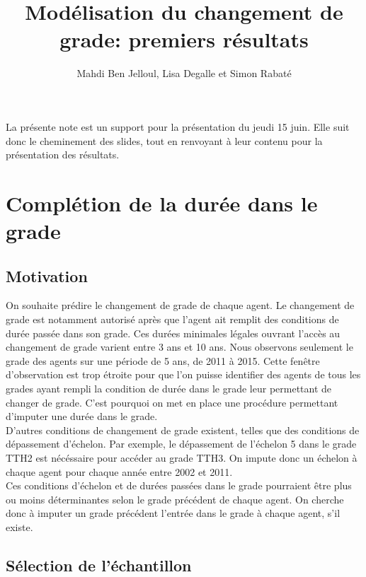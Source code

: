 \documentclass[11pt,a4paper]{article}
\begin{document}
\title{Modélisation du changement de grade: premiers résultats}


\author{Mahdi Ben Jelloul, Lisa Degalle et Simon Rabat\'e}


\maketitle


La présente note est un support pour la présentation du jeudi 15 juin. Elle suit donc le cheminement des slides, tout en renvoyant à leur contenu pour la présentation des résultats. 

\section{Complétion de la durée dans le grade}
\subsection{Motivation}

On souhaite prédire le changement de grade de chaque agent. Le changement de grade est notamment autorisé après que l'agent ait remplit des conditions de durée passée dans son grade. Ces durées minimales légales ouvrant l'accès au changement de grade varient entre 3 ans et 10 ans. Nous observons seulement le grade des agents sur une période de 5 ans, de 2011 à 2015. Cette fenêtre d'observation est trop étroite pour que l'on puisse identifier des agents de tous les grades ayant rempli la condition de durée dans le grade leur permettant de changer de grade. C'est pourquoi on met en place une procédure permettant d'imputer une durée dans le grade.\\
\indent D'autres conditions de changement de grade existent, telles que des conditions de dépassement d'échelon. Par exemple, le dépassement de l'échelon 5 dans le grade TTH2 est nécéssaire pour accéder au grade TTH3. On impute donc un échelon à chaque agent pour chaque année entre 2002 et 2011.\\
\indent Ces conditions d'échelon et de durées passées dans le grade pourraient être plus ou moins déterminantes selon le grade précédent de chaque agent. On cherche donc à imputer un grade précédent l'entrée dans le grade à chaque agent, s'il existe.

\subsection{Sélection de l'échantillon}
\end{document}
